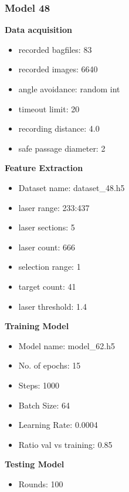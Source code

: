 \subsubsection{Model 48\label{model_48} }
\begin{multicols}{2}\textbf{Data acquisition}
\begin{itemize}
\setlength\itemsep{0.1em}
\item recorded bagfiles: 83
\item recorded images: 6640
\item angle avoidance: random int
\item timeout limit: 20
\item recording distance: 4.0
\item safe passage diameter: 2
\end{itemize}
\textbf{Feature Extraction}
\begin{itemize}
\setlength\itemsep{0.1em}
\item Dataset name: dataset\_48.h5
\item  laser range: 233:437
\item  laser sections: 5
\item  laser count: 666
\item  selection range: 1
\item  target count: 41
\item  laser threshold: 1.4
\end{itemize}
\columnbreak
\textbf{Training Model}
\begin{itemize}
\setlength\itemsep{0.1em}
\item  Model name: model\_62.h5
\item  No. of epochs: 15
\item  Steps: 1000
\item  Batch Size: 64
\item  Learning Rate: 0.0004
\item  Ratio val vs training: 0.85
\end{itemize}
\textbf{Testing Model}
\begin{itemize}
\setlength\itemsep{0.1em}
\item Rounds: 100
\newline
\newline
\newline
\newline
\newline
\newline
\newline
\newline

\end{itemize}
\end{multicols}
